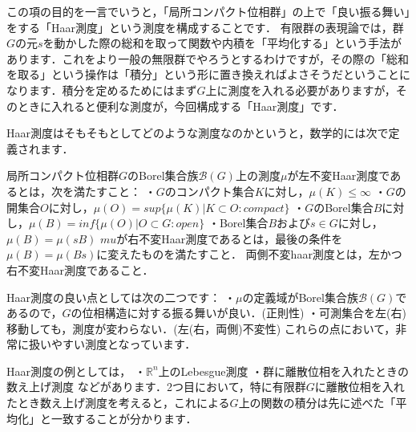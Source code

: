 

この項の目的を一言でいうと，「局所コンパクト位相群」の上で「良い振る舞い」をする「Haar測度」という測度を構成することです．
有限群の表現論では，群$G$の元$s$を動かした際の総和を取って関数や内積を「平均化する」という手法があります．これをより一般の無限群でやろうとするわけですが，その際の「総和を取る」という操作は「積分」という形に置き換えればよさそうだということになります．積分を定めるためにはまず$G$上に測度を入れる必要がありますが，そのときに入れると便利な測度が，今回構成する「Haar測度」です．

Haar測度はそもそもとしてどのような測度なのかというと，数学的には次で定義されます．
\begin{defi}[Haar測度]
局所コンパクト位相群$G$のBorel集合族$\mathscr{B}(G)$上の測度$\mu$が左不変Haar測度であるとは，次を満たすこと：
・$G$のコンパクト集合$K$に対し，$\mu(K) \le \infty$
・$G$の開集合$O$に対し，$\mu(O)=sup \{ \mu(K) | K \subset O \colon compact \}$
・$G$のBorel集合$B$に対し，$\mu(B)=inf \{ \mu(O) | O \subset G \colon open \}$
・Borel集合$B$および$s \in G$に対し，$\mu (B) = \mu (sB)$
$mu$が右不変Haar測度であるとは，最後の条件を$\mu (B) = \mu (Bs)$に変えたものを満たすこと．
両側不変haar測度とは，左かつ右不変Haar測度であること．
\end{defi}
Haar測度の良い点としては次の二つです：
・$\mu$の定義域がBorel集合族$\mathscr{B}(G)$であるので，$G$の位相構造に対する振る舞いが良い．(正則性)
・可測集合を左(右)移動しても，測度が変わらない．(左(右，両側)不変性)
これらの点において，非常に扱いやすい測度となっています．

Haar測度の例としては，
・$\mathbb{R}^n$上のLebesgue測度
・群に離散位相を入れたときの数え上げ測度
などがあります．2つ目において，特に有限群$G$に離散位相を入れたとき数え上げ測度を考えると，これによる$G$上の関数の積分は先に述べた「平均化」と一致することが分かります．

